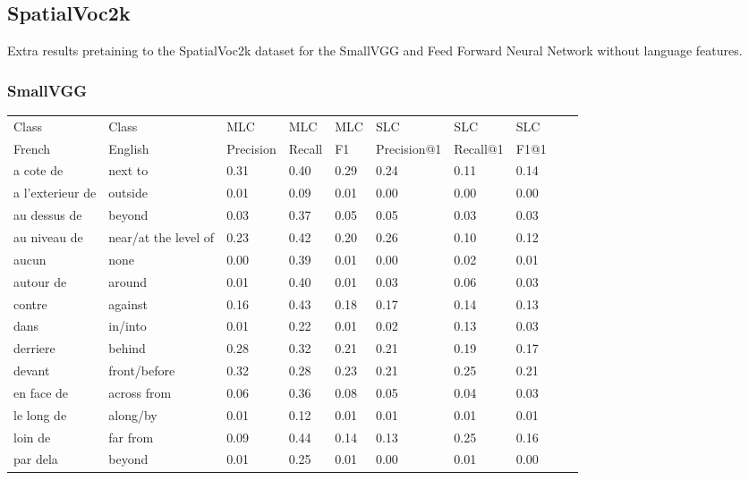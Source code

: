 \documentclass{csfyp}
\begin{document}
\newpage

\subsection{SpatialVoc2k}
Extra results pretaining to the SpatialVoc2k dataset for the SmallVGG and Feed Forward Neural Network without language features.

\subsubsection{SmallVGG}
\begin{table}[!htbp]
\centering

\begin{tabular}{|l|l|l|l|l|l|l|l|l|l}
\cline{1-8}
Class & Class & MLC  &  MLC  &  MLC & SLC &  SLC & SLC \\ \cline{1-8}
French & English & Precision &  Recall    & F1 & Precision@1 & Recall@1 & F1@1 \\ \cline{1-8}
a cote de	&	next to	&	0.31	&	0.40	&	0.29	&	0.24	&	0.11	&	0.14 \\ \cline{1-8}
a l'exterieur de	&	outside	&	0.01	&	0.09	&	0.01	&	0.00	&	0.00	&	0.00 \\ \cline{1-8}
au dessus de	&	beyond	&	0.03	&	0.37	&	0.05	&	0.05	&	0.03	&	0.03 \\ \cline{1-8}
au niveau de	&	near/at the level of	&	0.23	&	0.42	&	0.20	&	0.26	&	0.10	&	0.12 \\ \cline{1-8}
aucun	&	none	&	0.00	&	0.39	&	0.01	&	0.00	&	0.02	&	0.01 \\ \cline{1-8}
autour de	&	around	&	0.01	&	0.40	&	0.01	&	0.03	&	0.06	&	0.03 \\ \cline{1-8}
contre	&	against	&	0.16	&	0.43	&	0.18	&	0.17	&	0.14	&	0.13 \\ \cline{1-8}
dans	&	in/into	&	0.01	&	0.22	&	0.01	&	0.02	&	0.13	&	0.03 \\ \cline{1-8}
derriere	&	behind	&	0.28	&	0.32	&	0.21	&	0.21	&	0.19	&	0.17 \\ \cline{1-8}
devant	&	front/before	&	0.32	&	0.28	&	0.23	&	0.21	&	0.25	&	0.21 \\ \cline{1-8}
en face de	&	across from	&	0.06	&	0.36	&	0.08	&	0.05	&	0.04	&	0.03 \\ \cline{1-8}
le long de	&	along/by	&	0.01	&	0.12	&	0.01	&	0.01	&	0.01	&	0.01 \\ \cline{1-8}
loin de	&	far from	&	0.09	&	0.44	&	0.14	&	0.13	&	0.25	&	0.16 \\ \cline{1-8}
par dela	&	beyond	&	0.01	&	0.25	&	0.01	&	0.00	&	0.01	&	0.00 \\ \cline{1-8}

\end{tabular}
\end{table}
\end{document}
